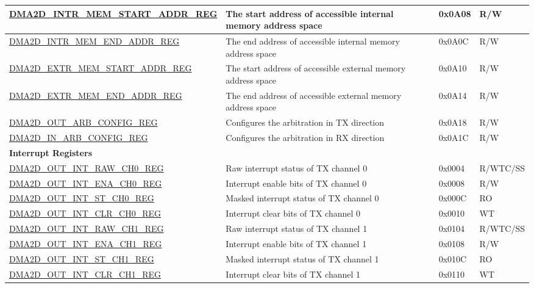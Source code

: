 \begin{longtable}{ | p{7cm} | p{11.5cm} | p{1.3cm} | p{2cm} | }
\hyperref[regdesc:DMA2DINTRMEMSTARTADDRREG]{DMA2D\_INTR\_MEM\_START\_ADDR\_REG} & The start address of accessible internal memory address space & 0x0A08 & R/W \\ \hline
\hyperref[regdesc:DMA2DINTRMEMENDADDRREG]{DMA2D\_INTR\_MEM\_END\_ADDR\_REG} & The end address of accessible internal memory address space & 0x0A0C & R/W \\ \hline
\hyperref[regdesc:DMA2DEXTRMEMSTARTADDRREG]{DMA2D\_EXTR\_MEM\_START\_ADDR\_REG} & The start address of accessible external memory address space & 0x0A10 & R/W \\ \hline
\hyperref[regdesc:DMA2DEXTRMEMENDADDRREG]{DMA2D\_EXTR\_MEM\_END\_ADDR\_REG} & The end address of accessible external memory address space & 0x0A14 & R/W \\ \hline
\hyperref[regdesc:DMA2DOUTARBCONFIGREG]{DMA2D\_OUT\_ARB\_CONFIG\_REG} & Configures the arbitration in TX direction & 0x0A18 & R/W \\ \hline
\hyperref[regdesc:DMA2DINARBCONFIGREG]{DMA2D\_IN\_ARB\_CONFIG\_REG} & Configures the arbitration in RX direction & 0x0A1C & R/W \\ \hline
\multicolumn{4}{|l|}{\textbf{Interrupt Registers}} \\ \hline
\hyperref[regdesc:DMA2DOUTINTRAWCHNREG]{DMA2D\_OUT\_INT\_RAW\_CH0\_REG} & Raw interrupt status of TX channel 0 & 0x0004 & R/WTC/SS \\ \hline
\hyperref[regdesc:DMA2DOUTINTENACHNREG]{DMA2D\_OUT\_INT\_ENA\_CH0\_REG} & Interrupt enable bits of TX channel 0 & 0x0008 & R/W \\ \hline
\hyperref[regdesc:DMA2DOUTINTSTCHNREG]{DMA2D\_OUT\_INT\_ST\_CH0\_REG} & Masked interrupt status of TX channel 0 & 0x000C & RO \\ \hline
\hyperref[regdesc:DMA2DOUTINTCLRCHNREG]{DMA2D\_OUT\_INT\_CLR\_CH0\_REG} & Interrupt clear bits of TX channel 0 & 0x0010 & WT \\ \hline
\hyperref[regdesc:DMA2DOUTINTRAWCHNREG]{DMA2D\_OUT\_INT\_RAW\_CH1\_REG} & Raw interrupt status of TX channel 1 & 0x0104 & R/WTC/SS \\ \hline
\hyperref[regdesc:DMA2DOUTINTENACHNREG]{DMA2D\_OUT\_INT\_ENA\_CH1\_REG} & Interrupt enable bits of TX channel 1 & 0x0108 & R/W \\ \hline
\hyperref[regdesc:DMA2DOUTINTSTCHNREG]{DMA2D\_OUT\_INT\_ST\_CH1\_REG} & Masked interrupt status of TX channel 1 & 0x010C & RO \\ \hline
\hyperref[regdesc:DMA2DOUTINTCLRCHNREG]{DMA2D\_OUT\_INT\_CLR\_CH1\_REG} & Interrupt clear bits of TX channel 1 & 0x0110 & WT \\ \hline

\end{longtable}

